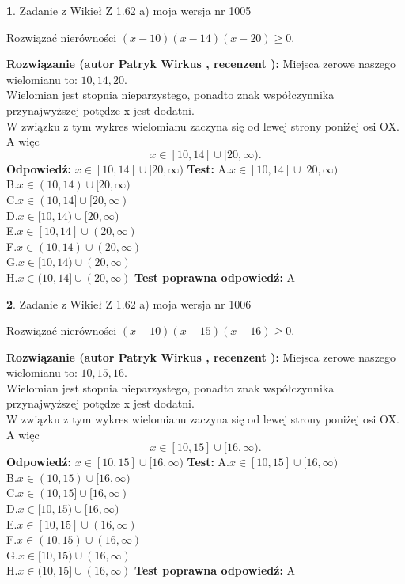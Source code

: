 \documentclass[12pt, a4paper]{article}
\theoremstyle{definition} %
\newtheorem{zad}{}
\newcommand{\zadStart}[1]{\begin{zad}#1\newline}
\newcommand{\zadStop}{\end{zad}}
\newcommand{\rozwStart}[2]{\noindent \textbf{Rozwiązanie (autor #1 , recenzent #2): }\newline}
\newcommand{\rozwStop}{\newline}
\newcommand{\odpStart}{\noindent \textbf{Odpowiedź:}\newline}
\newcommand{\odpStop}{\newline}
\newcommand{\testStart}{\noindent \textbf{Test:}\newline}
\newcommand{\testStop}{\newline}
\newcommand{\kluczStart}{\noindent \textbf{Test poprawna odpowiedź:}\newline}
\newcommand{\kluczStop}{\newline}
\begin{document}
\zadStart{Zadanie z Wikieł Z 1.62 a) moja wersja nr 1005}

Rozwiązać nierówności $(x-10)(x-14)(x-20)\ge0$.
\zadStop
\rozwStart{Patryk Wirkus}{}
Miejsca zerowe naszego wielomianu to: $10, 14, 20$.\\
Wielomian jest stopnia nieparzystego, ponadto znak współczynnika przy\linebreak najwyższej potędze x jest dodatni.\\ W związku z tym wykres wielomianu zaczyna się od lewej strony poniżej osi OX. A więc $$x \in [10,14] \cup [20,\infty).$$
\rozwStop
\odpStart
$x \in [10,14] \cup [20,\infty)$
\odpStop
\testStart
A.$x \in [10,14] \cup [20,\infty)$\\
B.$x \in (10,14) \cup [20,\infty)$\\
C.$x \in (10,14] \cup [20,\infty)$\\
D.$x \in [10,14) \cup [20,\infty)$\\
E.$x \in [10,14] \cup (20,\infty)$\\
F.$x \in (10,14) \cup (20,\infty)$\\
G.$x \in [10,14) \cup (20,\infty)$\\
H.$x \in (10,14] \cup (20,\infty)$
\testStop
\kluczStart
A
\kluczStop



\zadStart{Zadanie z Wikieł Z 1.62 a) moja wersja nr 1006}

Rozwiązać nierówności $(x-10)(x-15)(x-16)\ge0$.
\zadStop
\rozwStart{Patryk Wirkus}{}
Miejsca zerowe naszego wielomianu to: $10, 15, 16$.\\
Wielomian jest stopnia nieparzystego, ponadto znak współczynnika przy\linebreak najwyższej potędze x jest dodatni.\\ W związku z tym wykres wielomianu zaczyna się od lewej strony poniżej osi OX. A więc $$x \in [10,15] \cup [16,\infty).$$
\rozwStop
\odpStart
$x \in [10,15] \cup [16,\infty)$
\odpStop
\testStart
A.$x \in [10,15] \cup [16,\infty)$\\
B.$x \in (10,15) \cup [16,\infty)$\\
C.$x \in (10,15] \cup [16,\infty)$\\
D.$x \in [10,15) \cup [16,\infty)$\\
E.$x \in [10,15] \cup (16,\infty)$\\
F.$x \in (10,15) \cup (16,\infty)$\\
G.$x \in [10,15) \cup (16,\infty)$\\
H.$x \in (10,15] \cup (16,\infty)$
\testStop
\kluczStart
A
\kluczStop
\end{document}
